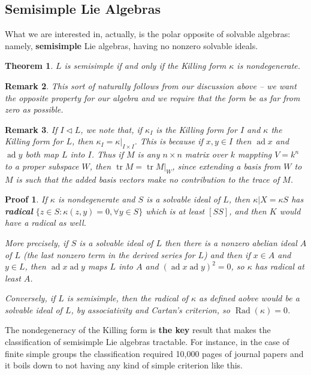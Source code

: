 \documentclass[12pt]{article}
\theoremstyle{nonumberbreak}
\theoremstyle{changebreak}
\newtheorem{thm}{Theorem}[subsection]
\theoremstyle{nonumberbreak}
\newtheorem{prf}{Proof}
\theoremstyle{change}
\newtheorem{rmk}[thm]{Remark}
\DeclareMathOperator{\tr}{tr}
\DeclareMathOperator{\ad}{ad}
\begin{document}
\subsection{Semisimple Lie Algebras}
What we are interested in, actually, is the polar opposite of solvable algebras: namely,
\textbf{semisimple} Lie algebras, having no nonzero solvable ideals.
\begin{thm}
	$L$ is semisimple if and only if the Killing form $\kappa$ is nondegenerate.
\end{thm}
\begin{rmk}
	This sort of naturally follows from our discussion above -- we want the opposite property for our algebra
	and we require that the form be as far from zero as possible.
\end{rmk}
\begin{rmk}
	If $I\lhd L$, we note that, if $\kappa_I$ is the Killing form for $I$ and $\kappa$ the Killing form for
	$L$, then $\kappa_I=\kappa|_{I\times I}$. This is because if $x,y\in I$ then $\ad x$ and $\ad y$ both map $L$ into $I$.
	Thus if $M$ is any $n\times n$ matrix over $k$ mappting $V=k^n$ to a proper subspace $W$, then $\tr M=\tr M|_W$, since 
	extending a basis from $W$ to $M$ is such that the added basis vectors make no contribution to the trace of $M$.
\end{rmk}

\begin{prf}
	If $\kappa$ is nondegenerate and $S$ is a solvable ideal of $L$, then $\kappa|X=\kappa S$ has
	\textbf{radical} $\{z\in S:\kappa(z,y)=0,\forall y\in S\}$ which is at least $[SS]$, and then $K$ would have a 
	radical as well.

	More precisely, if $S$ is a solvable ideal of $L$ then there is a nonzero abelian ideal $A$ of $L$
	(the last nonzero term in the derived series for $L$) and then if $x\in A$ and $y\in L$, then $\ad x\ad y$ maps $L$
	into $A$ and $(\ad x\ad y)^2=0$, so $\kappa$ has radical at least $A$.

	Conversely, if $L$ is semisimple, then the radical of $\kappa$ as defined aobve would be a solvable ideal of $L$,
	by associativity and Cartan's criterion, so $\operatorname{Rad}(\kappa)=0$.
\end{prf}

The nondegeneracy of the Killing form is \textbf{the key} result that makes the classification
of semisimple Lie algebras tractable. For instance, in the case of finite simple groups the classification required 
10,000 pages of journal papers and it boils down to not having any kind of simple criterion like this.
\end{document}

